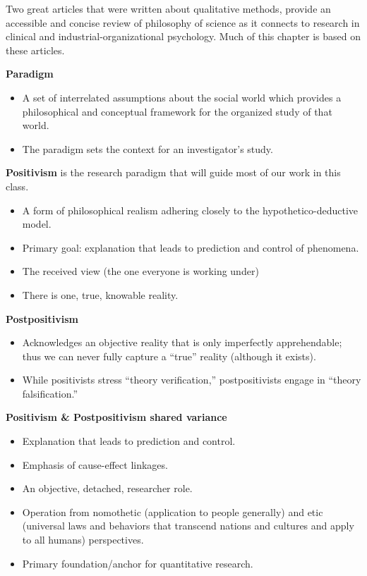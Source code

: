 \documentclass[
  english,
]{book}
\providecommand{\tightlist}{%
  \setlength{\itemsep}{0pt}\setlength{\parskip}{0pt}}
\begin{document}
Two great articles that were written about qualitative methods, provide an accessible and concise review of philosophy of science as it connects to research in clinical \citep{ponterotto_qualitative_2005} and industrial-organizational \citep{cortina_doing_2013} psychology. Much of this chapter is based on these articles.

\textbf{Paradigm}

\begin{itemize}
\tightlist
\item
  A set of interrelated assumptions about the social world which provides a philosophical and conceptual framework for the organized study of that world.
\item
  The paradigm sets the context for an investigator's study.
\end{itemize}

\textbf{Positivism} is the research paradigm that will guide most of our work in this class.

\begin{itemize}
\tightlist
\item
  A form of philosophical realism adhering closely to the hypothetico-deductive model.
\item
  Primary goal: explanation that leads to prediction and control of phenomena.
\item
  The received view (the one everyone is working under)
\item
  There is one, true, knowable reality.
\end{itemize}

\textbf{Postpositivism}

\begin{itemize}
\tightlist
\item
  Acknowledges an objective reality that is only imperfectly apprehendable; thus we can never fully capture a ``true'' reality (although it exists).
\item
  While positivists stress ``theory verification,'' postpositivists engage in ``theory falsification.''
\end{itemize}

\textbf{Positivism \& Postpositivism shared variance}

\begin{itemize}
\tightlist
\item
  Explanation that leads to prediction and control.
\item
  Emphasis of cause-effect linkages.
\item
  An objective, detached, researcher role.
\item
  Operation from nomothetic (application to people generally) and etic (universal laws and behaviors that transcend nations and cultures and apply to all humans) perspectives.
\item
  Primary foundation/anchor for quantitative research.
\end{itemize}
\end{document}
